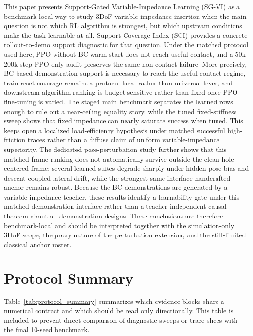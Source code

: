 ﻿\documentclass[11pt]{article}
\begin{document}
This paper presents Support-Gated Variable-Impedance Learning (SG-VI) as a benchmark-local way to
study 3DoF variable-impedance insertion when the main question is not which RL algorithm is
strongest, but which upstream conditions make the task learnable at all. Support Coverage Index
(SCI) provides a concrete rollout-to-demo support diagnostic for that question. Under the matched
protocol used here, PPO without BC warm-start does not reach useful contact, and a 50k--200k-step
PPO-only audit preserves the same non-contact failure. More precisely, BC-based demonstration
support is necessary to reach the useful contact regime, train-reset coverage remains a
protocol-local rather than universal lever, and downstream algorithm ranking is budget-sensitive
rather than fixed once PPO fine-tuning is varied. The stage4 main benchmark separates the learned
rows enough to rule out a near-ceiling equality story, while the tuned fixed-stiffness sweep shows
that fixed impedance can nearly saturate success when tuned. This keeps open a localized
load-efficiency hypothesis under matched successful high-friction traces rather than a diffuse claim
of uniform variable-impedance superiority. The dedicated pose-perturbation study further shows that this matched-frame
ranking does not automatically survive outside the clean hole-centered frame: several learned suites
degrade sharply under hidden pose bias and descent-coupled lateral drift, while the strongest
same-interface handcrafted anchor remains robust. Because the BC demonstrations are generated by a
variable-impedance teacher, these results identify a learnability gate under this matched-demonstration interface rather than a teacher-independent causal theorem about all demonstration designs. These
conclusions are therefore benchmark-local and should be interpreted together with the simulation-only
3DoF scope, the proxy nature of the perturbation extension, and the still-limited classical anchor
roster.

\FloatBarrier
\appendix

\renewcommand{\thefigure}{A\arabic{figure}}
\setcounter{figure}{0}
\renewcommand{\thetable}{A\arabic{table}}
\setcounter{table}{0}

\section{Protocol Summary}
\label{app:protocol-summary}

Table~\ref{tab:protocol_summary} summarizes which evidence blocks share a numerical contract and
which should be read only directionally. This table is included to prevent direct comparison of
diagnostic sweeps or trace slices with the final 10-seed benchmark.
\end{document}

